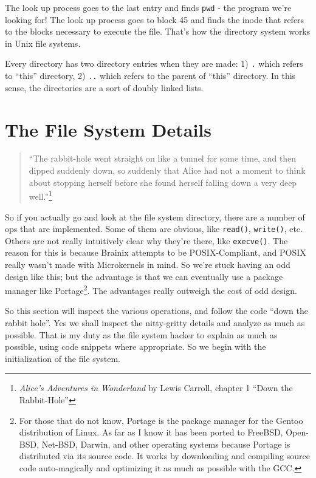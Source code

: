 \documentclass{article}
\begin{document}
The look up process goes to the last entry and finds \verb|pwd| - the program we're looking for! The look up process goes to block 45 and finds the inode that refers to the blocks necessary to execute the file. That's how the directory system works in Unix file systems.

Every directory has two directory entries when they are made: 1) \verb|.| which refers to ``this'' directory, 2) \verb|..| which refers to the parent of ``this'' directory. In this sense, the directories are a sort of doubly linked lists.

\section{The File System Details}

\begin{quote}
``The rabbit-hole went straight on like a tunnel for some time, and then dipped suddenly down, so suddenly that Alice had not a moment to think about stopping herself before she found herself falling down a very deep well.''\footnote{\textit{Alice's Adventures in Wonderland} by Lewis Carroll, chapter 1 ``Down the Rabbit-Hole''}
\end{quote}

So if you actually go and look at the file system directory, there are a number of ops that are implemented. Some of them are obvious, like \verb|read()|, \verb|write()|, etc. Others are not really intuitively clear why they're there, like \verb|execve()|. The reason for this is because Brainix attempts to be POSIX-Compliant, and POSIX really wasn't made with Microkernels in mind. So we're stuck having an odd design like this; but the advantage is that we can eventually use a package manager like Portage\footnote{For those that do not know, Portage is the package manager for the Gentoo distribution of Linux. As far as I know it has been ported to FreeBSD, Open-BSD, Net-BSD, Darwin, and other operating systems because Portage is distributed via its source code. It works by downloading and compiling source code auto-magically and optimizing it as much as possible with the GCC.}. The advantages really outweigh the cost of odd design.

So this section will inspect the various operations, and follow the code ``down the rabbit hole''. Yes we shall inspect the nitty-gritty details and analyze as much as possible. That is my duty as the file system hacker to explain as much as possible, using code snippets where appropriate. So we begin with the initialization of the file system.
\end{document}
